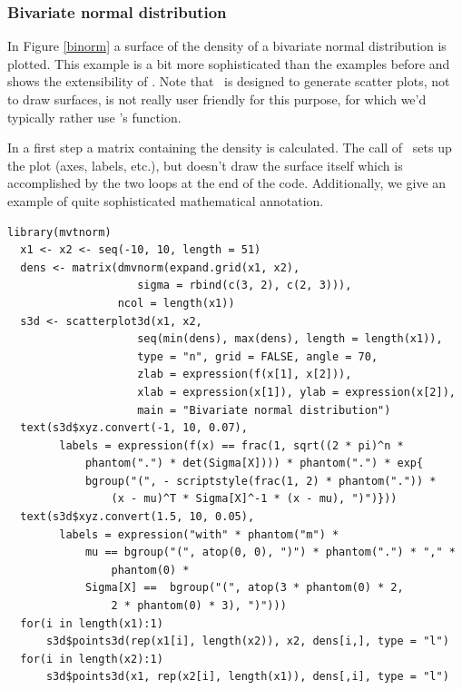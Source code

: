 \subsubsection{Bivariate normal distribution}
In Figure \ref{binorm} a surface of the density of a bivariate normal
distribution is plotted.  This example is a bit more sophisticated than the
examples before and shows the extensibility of \sdd.  Note that \sdd\
is designed to generate  scatter plots, not to draw surfaces,
is not really user friendly for this purpose, for which we'd typically
rather use \RR's \code{persp} function.

In a first step a matrix containing the density is calculated.
The call of \sdd\ sets up the plot (axes, labels, etc.), but doesn't draw
the surface itself which is accomplished by the two loops at the end of the
code.  Additionally, we give an example of quite sophisticated mathematical
annotation.
\clearpage
\small
\begin{Verbatim}[frame=single]
  library(mvtnorm)
  x1 <- x2 <- seq(-10, 10, length = 51)
  dens <- matrix(dmvnorm(expand.grid(x1, x2),
                    sigma = rbind(c(3, 2), c(2, 3))),
                 ncol = length(x1))
  s3d <- scatterplot3d(x1, x2,
                    seq(min(dens), max(dens), length = length(x1)),
                    type = "n", grid = FALSE, angle = 70,
                    zlab = expression(f(x[1], x[2])),
                    xlab = expression(x[1]), ylab = expression(x[2]),
                    main = "Bivariate normal distribution")
  text(s3d$xyz.convert(-1, 10, 0.07),
        labels = expression(f(x) == frac(1, sqrt((2 * pi)^n *
            phantom(".") * det(Sigma[X]))) * phantom(".") * exp{
            bgroup("(", - scriptstyle(frac(1, 2) * phantom(".")) *
                (x - mu)^T * Sigma[X]^-1 * (x - mu), ")")}))
  text(s3d$xyz.convert(1.5, 10, 0.05),
        labels = expression("with" * phantom("m") *
            mu == bgroup("(", atop(0, 0), ")") * phantom(".") * "," *
                phantom(0) *
            Sigma[X] ==  bgroup("(", atop(3 * phantom(0) * 2,
                2 * phantom(0) * 3), ")")))
  for(i in length(x1):1)
      s3d$points3d(rep(x1[i], length(x2)), x2, dens[i,], type = "l")
  for(i in length(x2):1)
      s3d$points3d(x1, rep(x2[i], length(x1)), dens[,i], type = "l")
\end{Verbatim}
\normalsize

